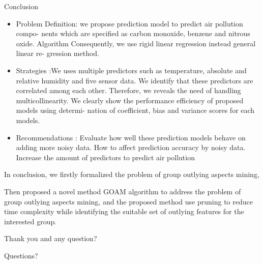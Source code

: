 \documentclass[
 size=14pt,
 paper=smartboard,  %
 mode=present, 		%
 display=slides, 	%
 style=tuliplab,  	%
 pauseslide,
 fleqn,leqno]{powerdot}
\begin{document}
\begin{slide}[toc=,bm=]{Conclusion}
\begin{itemize}
\item
\smallskip
Problem Definition: we propose prediction model to predict air pollution compo-
nents which are specified as carbon monoxide, benzene and nitrous oxide.
Algorithm Consequently, we use rigid linear regression instead general linear re-
gression method.


\item
\smallskip
Strategies :We uses multiple predictors such as temperature, absolute and relative
humidity and five sensor data. We identify that these predictors are correlated
among each other. Therefore, we reveals the need of handling multicollinearity.
We clearly show the performance efficiency of proposed models using determi-
nation of coefficient, bias and variance scores for each models.

\item
\smallskip
Recommendations : Evaluate how well these prediction models behave on adding
more noisy data. How to affect prediction accuracy by noisy data. Increase the
amount of predictors to predict air pollution

\end{itemize}

\begin{note}
In conclusion,
we firstly formalized the problem of
group outlying aspects mining,

Then proposed a novel method GOAM algorithm to address the problem of
group outlying aspects mining,
and the proposed method use pruning to reduce time complexity
while identifying the suitable set of outlying features for the interested group.

Thank you and any question?
\end{note}

\end{slide}


%
\begin{slide}[toc=,bm=]{Questions?}
\begin{center}
\begin{figure}
\end{figure}
\end{center}
\end{slide}
\end{document}
